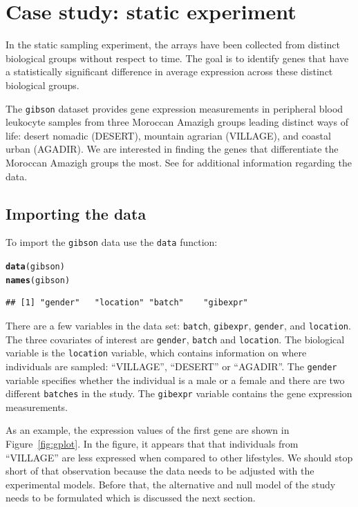 \documentclass{article}\usepackage[]{graphicx}\usepackage[]{color}
\makeatletter
\newcommand{\hlstd}[1]{\textcolor[rgb]{0.345,0.345,0.345}{#1}}%
\newcommand{\hlkwd}[1]{\textcolor[rgb]{0.737,0.353,0.396}{\textbf{#1}}}%
\newenvironment{kframe}{%
 \def\at@end@of@kframe{}%
 \ifinner\ifhmode%
  \def\at@end@of@kframe{\end{minipage}}%
  \begin{minipage}{\columnwidth}%
 \fi\fi%
 \def\FrameCommand##1{\hskip\@totalleftmargin \hskip-\fboxsep
 \colorbox{shadecolor}{##1}\hskip-\fboxsep
     \hskip-\linewidth \hskip-\@totalleftmargin \hskip\columnwidth}%
 \MakeFramed {\advance\hsize-\width
   \@totalleftmargin\z@ \linewidth\hsize
   \@setminipage}}%
 {\par\unskip\endMakeFramed%
 \at@end@of@kframe}
\newenvironment{knitrout}{}{} %
\makeatother
\begin{document}
\section{Case study: static experiment}
\label{sec:gibson}
In the static sampling experiment, the arrays have been collected from distinct biological groups without respect to time. The goal is to identify genes that have a statistically significant difference in average expression across these distinct biological groups. 

The {\tt gibson} dataset provides gene expression measurements in peripheral blood leukocyte samples from three Moroccan Amazigh groups leading distinct ways of life: desert nomadic (DESERT), mountain agrarian (VILLAGE), and coastal urban (AGADIR). We are interested in finding the genes that differentiate the Moroccan Amazigh groups the most. See \cite{gibson:2008} for additional information regarding the data.

\subsection{Importing the data}
To import the {\tt gibson} data use the {\tt data} function:
\begin{knitrout}
\color{fgcolor}\begin{kframe}
\begin{alltt}
\hlkwd{data}\hlstd{(gibson)}
\hlkwd{names}\hlstd{(gibson)}
\end{alltt}
\begin{verbatim}
## [1] "gender"   "location" "batch"    "gibexpr"
\end{verbatim}
\end{kframe}
\end{knitrout}
There are a few variables in the data set: {\tt batch}, {\tt gibexpr}, {\tt gender}, and {\tt location}. The three covariates of interest are {\tt gender}, {\tt batch} and {\tt location}. The biological variable is the {\tt location} variable, which contains information on where individuals are sampled: ``VILLAGE'', ``DESERT'' or ``AGADIR''. The {\tt gender} variable specifies whether the individual is a male or a female and there are two different {\tt batches} in the study. The {\tt gibexpr} variable contains the gene expression measurements. 

As an example, the expression values of the first gene are shown in Figure~\ref{fig:gplot}. In the figure, it appears that that individuals from ``VILLAGE'' are less expressed when compared to other lifestyles. We should stop short of that observation because the data needs to be adjusted with the experimental models. Before that, the alternative and null model of the study needs to be formulated which is discussed the next section.
\end{document}
